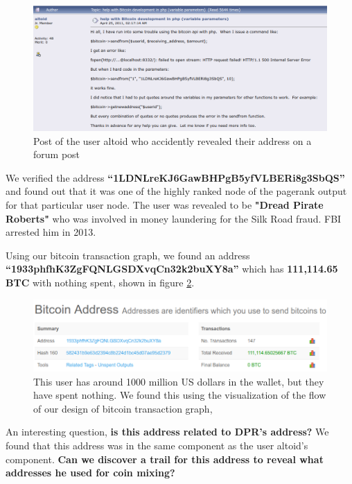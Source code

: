 \documentclass[runningheads,a4paper]{llncs}[2017/09/04]
\begin{document}
\begin{figure}[!htb]
	\centering 
	\includegraphics[width=\columnwidth]{post} 
	\caption{Post of the user altoid who accidently revealed their address on a forum post} %
	\label{post}
\end{figure}

We verified the address \textbf{“1LDNLreKJ6GawBHPgB5yfVLBERi8g3SbQS”} and found out that it was one of the highly ranked node of the pagerank output for that particular user node.
The user was revealed to be \textbf{"Dread Pirate Roberts"} who was involved in money laundering for the Silk Road fraud. FBI arrested him in 2013.

Using our bitcoin transaction graph, we found an address \\
\textbf{“1933phfhK3ZgFQNLGSDXvqCn32k2buXY8a”} which has \textbf{111,114.65 BTC} with nothing spent, shown in figure \ref{spent}.

\begin{figure}[h]
	\centering 
	\includegraphics[width=\columnwidth]{spent} 
	\caption{This user has around 1000 million US dollars in the wallet, but they have spent nothing. We found this using the visualization of the flow of our design of bitcoin transaction graph,} %
	\label{spent}
\end{figure}

An interesting question, \textbf{is this address related to DPR’s address?}
We found that this address was in the same component as the user altoid’s component.
\textbf{Can we discover a trail for this address to reveal what addresses he used for coin mixing?}
\end{document}
